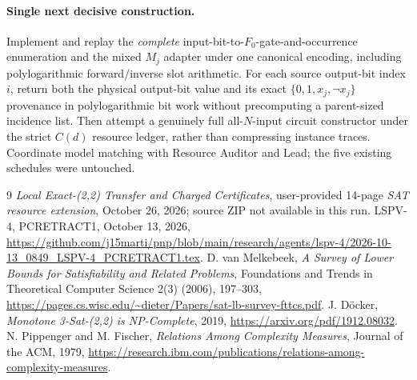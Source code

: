 \documentclass[11pt]{article}
\begin{document}
\paragraph{Single next decisive construction.}
Implement and replay the \emph{complete}
input-bit-to-\(F_0\)-gate-and-occurrence enumeration and the
mixed \(M_j\) adapter under one canonical encoding, including
polylogarithmic forward/inverse slot arithmetic. For each
source output-bit index \(i\), return both the physical
output-bit value and its exact \(\{0,1,x_j,\neg x_j\}\)
provenance in polylogarithmic bit work without
precomputing a parent-sized incidence list. Then
attempt a genuinely full all-\(N\)-input circuit
constructor under the strict \(C(d)\) resource
ledger, rather than compressing instance traces.
Coordinate model matching with Resource Auditor
and Lead; the five existing schedules were untouched.

\begin{thebibliography}{9}
 \emph{Local Exact-(2,2) Transfer and Charged Certificates},
user-provided 14-page \emph{SAT resource extension},
October 26, 2026; source ZIP not available in this run.
 LSPV-4, PCRETRACT1, October 13, 2026,
\url{https://github.com/j15marti/pnp/blob/main/research/agents/lspv-4/2026-10-13_0849_LSPV-4_PCRETRACT1.tex}.
 D. van Melkebeek, \emph{A Survey of Lower
Bounds for Satisfiability and Related Problems},
Foundations and Trends in Theoretical Computer Science
2(3) (2006), 197--303,
\url{https://pages.cs.wisc.edu/~dieter/Papers/sat-lb-survey-fttcs.pdf}.
 J. D\"ocker, \emph{Monotone 3-Sat-(2,2)
is NP-Complete}, 2019, \url{https://arxiv.org/pdf/1912.08032}.
 N. Pippenger and M. Fischer,
\emph{Relations Among Complexity Measures},
Journal of the ACM, 1979,
\url{https://research.ibm.com/publications/relations-among-complexity-measures}.
\end{thebibliography}
\end{document}
